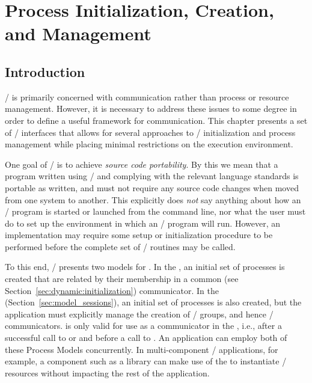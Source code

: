\chapter{Process Initialization, Creation, and Management}
\label{sec:dynamic-2}
\label{chap:dynamic-2}

\section{Introduction}
\label{sec:dynamic:introduction}

\mpi/ is primarily concerned with communication rather than process or
resource management.  However, it is necessary to address these issues
to some degree in order to define a useful framework for communication.
This chapter presents a set of \mpi/ interfaces that allows for
several approaches to \MPI/ initialization and
process management while placing minimal
restrictions on the execution environment.

One goal of \MPI/ is to achieve \emph{source code portability}.  By this we mean
that a program written using \MPI/ and complying with the relevant language
standards is portable as written, and must not require any source code changes
when moved from one system to another.  This explicitly does \emph{not} say
anything about how an \MPI/ program is started or launched from the command
line, nor what the user must do to set up the environment in which an \MPI/
program will run.  However, an implementation may require some setup or initialization
procedure to be performed before the complete set of \MPI/ routines may be called.

To this end, \mpi/ presents two models for .
In the \wpm{}\mpitermindex{\wpm},
an initial set of processes is created that are related by their membership in a common
(see Section~\ref{sec:dynamic:initialization}) communicator.
In the \spm{}\mpitermindex{\spm} (Section~\ref{sec:model_sessions}),
an initial set of processes is also created, but the application must explicitly manage the
creation of \MPI/ groups, and hence \MPI/ communicators.
 is only valid for use as a communicator in the \wpm{}, i.e., after a successful
call to  or  and before a call to .
An application can employ both of these Process Models concurrently.
In multi-component \mpi/ applications, for example, a component such as a library
can make use of the \spm{} to instantiate \MPI/ resources without impacting the rest of the application.

